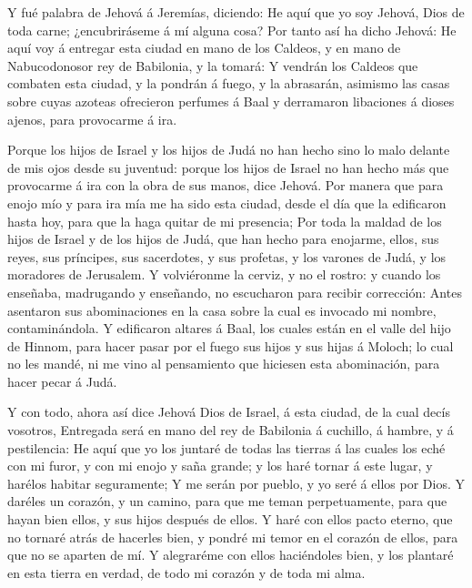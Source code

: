  Y fué palabra de Jehová á Jeremías, diciendo:
 He aquí que yo soy Jehová, Dios de toda carne;
¿encubriráseme á mí alguna cosa?  Por tanto así ha dicho
Jehová: He aquí voy á entregar esta ciudad en mano de los Caldeos, y en
mano de Nabucodonosor rey de Babilonia, y la tomará:  Y
vendrán los Caldeos que combaten esta ciudad, y la pondrán á fuego, y la
abrasarán, asimismo las casas sobre cuyas azoteas ofrecieron perfumes á
Baal y derramaron libaciones á dioses ajenos, para provocarme á ira.

 Porque los hijos de Israel y los hijos de Judá no han
hecho sino lo malo delante de mis ojos desde su juventud: porque los
hijos de Israel no han hecho más que provocarme á ira con la obra de sus
manos, dice Jehová.  Por manera que para enojo mío y para
ira mía me ha sido esta ciudad, desde el día que la edificaron hasta
hoy, para que la haga quitar de mi presencia;  Por toda
la maldad de los hijos de Israel y de los hijos de Judá, que han hecho
para enojarme, ellos, sus reyes, sus príncipes, sus sacerdotes, y sus
profetas, y los varones de Judá, y los moradores de Jerusalem.
 Y volviéronme la cerviz, y no el rostro: y cuando los
enseñaba, madrugando y enseñando, no escucharon para recibir corrección:
 Antes asentaron sus abominaciones en la casa sobre la
cual es invocado mi nombre, contaminándola.  Y edificaron
altares á Baal, los cuales están en el valle del hijo de Hinnom, para
hacer pasar por el fuego sus hijos y sus hijas á Moloch; lo cual no les
mandé, ni me vino al pensamiento que hiciesen esta abominación, para
hacer pecar á Judá.

 Y con todo, ahora así dice Jehová Dios de Israel, á esta
ciudad, de la cual decís vosotros, Entregada será en mano del rey de
Babilonia á cuchillo, á hambre, y á pestilencia:  He aquí
que yo los juntaré de todas las tierras á las cuales los eché con mi
furor, y con mi enojo y saña grande; y los haré tornar á este lugar, y
harélos habitar seguramente;  Y me serán por pueblo, y yo
seré á ellos por Dios.  Y daréles un corazón, y un
camino, para que me teman perpetuamente, para que hayan bien ellos, y
sus hijos después de ellos.  Y haré con ellos pacto
eterno, que no tornaré atrás de hacerles bien, y pondré mi temor en el
corazón de ellos, para que no se aparten de mí.  Y
alegraréme con ellos haciéndoles bien, y los plantaré en esta tierra en
verdad, de todo mi corazón y de toda mi alma.

